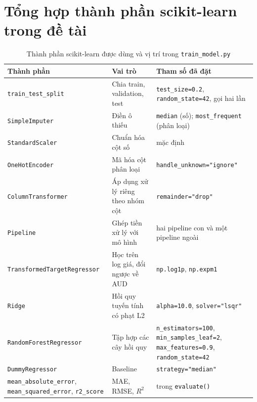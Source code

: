\section{Tổng hợp thành phần scikit-learn trong đề tài}\label{sec:tonghop}
\begin{table}[H]
\centering
\caption{Thành phần scikit-learn được dùng và vị trí trong \texttt{train\_model.py}}\label{tab:thanhphan}
\small
\begin{tabular}{@{}L{3.6cm} L{4.4cm} L{4.6cm}@{}}
\toprule
Thành phần & Vai trò & Tham số đã đặt \\
\midrule
\texttt{train\_test\_split} & Chia train, validation, test & \texttt{test\_size=0.2}, \texttt{random\_state=42}, gọi hai lần \\
\texttt{SimpleImputer} & Điền ô thiếu & \texttt{median} (số); \texttt{most\_frequent} (phân loại) \\
\texttt{StandardScaler} & Chuẩn hóa cột số & mặc định \\
\texttt{OneHotEncoder} & Mã hóa cột phân loại & \texttt{handle\_unknown="ignore"} \\
\texttt{ColumnTransformer} & Áp dụng xử lý riêng theo nhóm cột & \texttt{remainder="drop"} \\
\texttt{Pipeline} & Ghép tiền xử lý với mô hình & hai pipeline con và một pipeline ngoài \\
\texttt{Transformed}\allowbreak\texttt{TargetRegressor} & Học trên log giá, đổi ngược về AUD & \texttt{np.log1p}, \texttt{np.expm1} \\
\texttt{Ridge} & Hồi quy tuyến tính có phạt L2 & \texttt{alpha=10.0}, \texttt{solver="lsqr"} \\
\texttt{RandomForest}\allowbreak\texttt{Regressor} & Tập hợp các cây hồi quy & \texttt{n\_estimators=100}, \texttt{min\_samples\_leaf=2}, \texttt{max\_features=0.9}, \texttt{random\_state=42} \\
\texttt{DummyRegressor} & Baseline & \texttt{strategy="median"} \\
\texttt{mean\_absolute\_error}, \texttt{mean\_}\allowbreak\texttt{squared\_error}, \texttt{r2\_score} & MAE, RMSE, $R^2$ & trong \texttt{evaluate()} \\
\bottomrule
\end{tabular}
\end{table}

